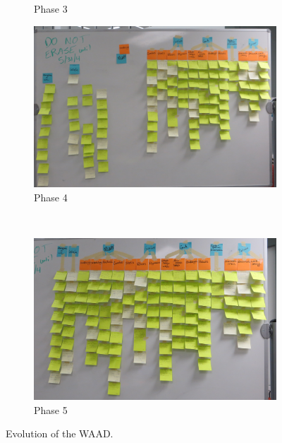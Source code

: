 \documentclass[12pt]{article} %
\begin{document}
\begin{figure}[H]
\begin{subfigure}{.5\linewidth}
  \caption{Phase 3}
  \label{fig:WAAD_version3}
  \end{subfigure}%
  \begin{subfigure}{.5\linewidth}
  \centering
  \includegraphics[width=0.95\linewidth]{WAAD_version4}
  \caption{Phase 4}
  \label{fig:WAAD_version4}
  \end{subfigure}\\[1ex]
  \begin{subfigure}{\linewidth}
  \centering
  \includegraphics[width=0.55\linewidth]{WAAD_version5}
  \caption{Phase 5}
  \label{fig:WAAD_version5}
  \end{subfigure}
  \caption{Evolution of the WAAD.}
  \label{fig:WAAD}
  \end{figure}
\end{document}
